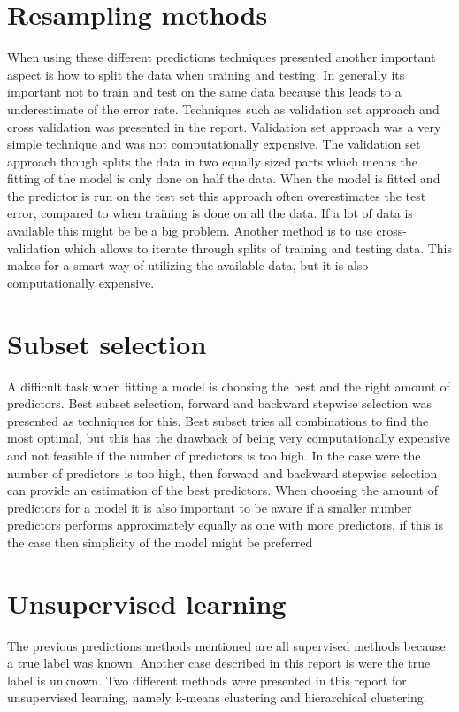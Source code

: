 \section{Resampling methods}
When using these different predictions techniques presented another important aspect is how to split the data when training and testing. In generally its important not to train and test on the same data because this leads to a underestimate of the error rate. Techniques such as validation set approach and cross validation was presented in the report. Validation set approach was a very simple technique and was not computationally expensive. The validation set approach though splits the data in two equally sized parts which means the fitting of the model is only done on half the data. When the model is fitted and the predictor is run on the test set this approach often overestimates the test error, compared to when training is done on all the data. If a lot of data is available this might be be a big problem. Another method is to use cross-validation which allows to iterate through splits of training and testing data. This makes for a smart way of utilizing the available data, but it is also computationally expensive.


\section{Subset selection}
A difficult task when fitting a model is choosing the best and the right amount of predictors. Best subset selection, forward and backward stepwise selection was presented as techniques for this. Best subset tries all combinations to find the most optimal, but this has the drawback of being very computationally expensive and not feasible if the number of predictors is too high. In the case were the number of predictors is too high, then forward and backward stepwise selection can provide an estimation of the best predictors. When choosing the amount of predictors for a model it is also important to be aware if a smaller number predictors performs approximately equally as one with more predictors, if this is the case then simplicity of the model might be preferred

\section{Unsupervised learning}
The previous predictions methods mentioned are all supervised methods because a true label was known. Another case described in this report is were the true label is unknown. Two different methods were presented in this report for unsupervised learning, namely k-means clustering and hierarchical clustering.
